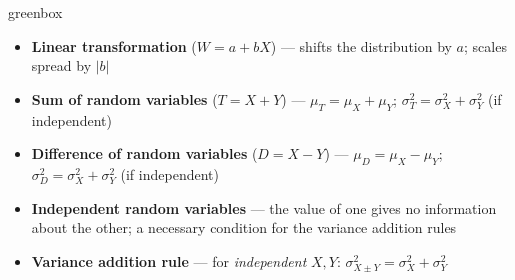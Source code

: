 \documentclass[10pt]{article}
\begin{document}
\begin{skillbox}{greenbox}
\begin{minipage}[t]{0.48\linewidth}
    \begin{itemize}
        \item \textbf{Linear transformation} ($W = a + bX$) --- shifts the distribution by
              $a$; scales spread by $|b|$
        \item \textbf{Sum of random variables} ($T = X + Y$) --- $\mu_T = \mu_X + \mu_Y$;
              $\sigma^2_T = \sigma^2_X + \sigma^2_Y$ (if independent)
        \item \textbf{Difference of random variables} ($D = X - Y$) ---
              $\mu_D = \mu_X - \mu_Y$; $\sigma^2_D = \sigma^2_X + \sigma^2_Y$ (if independent)
    \end{itemize}
\end{minipage}
\hfill
\begin{minipage}[t]{0.48\linewidth}
    \begin{itemize}
        \item \textbf{Independent random variables} --- the value of one gives no information
              about the other; a necessary condition for the variance addition rules
        \item \textbf{Variance addition rule} --- for \emph{independent} $X, Y$:
              $\sigma^2_{X \pm Y} = \sigma^2_X + \sigma^2_Y$
    \end{itemize}
\end{minipage}
\end{skillbox}
\end{document}
